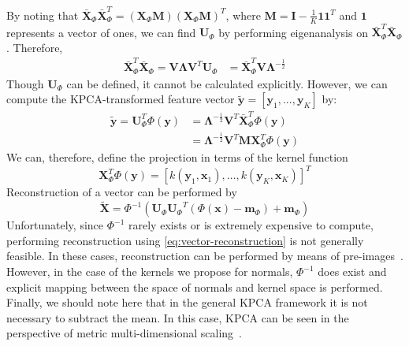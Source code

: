By noting that 
$\mathbf{\bar{X}}_\Phi \mathbf{\bar{X}}_\Phi^T = (\mathbf{X}_\Phi \mathbf{M}) (\mathbf{X}_\Phi \mathbf{M})^T$, 
where $\mathbf{M} = \mathbf{I} - \frac{1}{K} \mathbf{1} \mathbf{1}^T$ and
$\mathbf{1}$ represents a vector of ones, we can find
$\mathbf{U}_\Phi$ by performing eigenanalysis on
$\bar{\mathbf{X}}_\Phi^T \bar{\mathbf{X}}_\Phi$. Therefore,
\begin{equation}
    \begin{aligned}\label{eq:x-bar-corr}
        \mathbf{\bar{X}}_\Phi^T \mathbf{\bar{X}}_\Phi = \mathbf{V} \boldsymbol{\Lambda} \mathbf{V}^T \mathbf{U}_{\Phi} &= \mathbf{\bar{X}}_\Phi^T \mathbf{V} \boldsymbol{\Lambda}^{-\frac{1}{2}}
    \end{aligned}
\end{equation}
Though $\mathbf{U}_\Phi$ can be defined, it cannot be calculated explicitly. 
However, we can compute the KPCA-transformed feature vector
 $\mathbf{\tilde{y}} = [\mathbf{y}_1, ..., \mathbf{y}_K]$ by:
\begin{equation}
    \begin{aligned}\label{eq:projections}
        \mathbf{\tilde{y}} = \mathbf{U}_\Phi^T \Phi(\mathbf{y}) &= \boldsymbol{\Lambda}^{-\frac{1}{2}} \mathbf{V}^T \mathbf{\bar{X}}_\Phi^T \Phi(\mathbf{y}) \\
        &= \boldsymbol{\Lambda}^{-\frac{1}{2}} \mathbf{V}^T \mathbf{M} \mathbf{X}_\Phi^T \Phi(\mathbf{y})
    \end{aligned}
\end{equation}
We can, therefore, define the projection in terms of the kernel function
\begin{equation}\label{eq:kernel-vector}
        \mathbf{X}_\Phi^T \Phi(\mathbf{y}) = \left[ k(\mathbf{y}_1, \mathbf{x}_1), \ldots, k(\mathbf{y}_K, \mathbf{x}_K) \right]^T
\end{equation}
Reconstruction of a vector can be performed by
\begin{equation}\label{eq:vector-reconstruction}
        \mathbf{\tilde{X}} = {\Phi}^{-1} \left( \mathbf{U}_{\Phi} {\mathbf{U}_{\Phi}}^T (\Phi(\mathbf{x}) - \mathbf{m}_{\Phi}) + \mathbf{m}_{\Phi} \right)
\end{equation}
Unfortunately, since ${\Phi}^{-1}$ rarely exists or is extremely expensive to 
compute, performing reconstruction using \cref{eq:vector-reconstruction} is not 
generally feasible. In these cases, reconstruction can be performed by means of 
pre-images~\cite{kwok2004pre}. However, in the case of the kernels we propose
for normals, ${\Phi}^{-1}$ does exist and explicit mapping between the space of
normals and kernel space is performed. Finally, we should note here that in the 
general KPCA framework it is not necessary to subtract the mean. In this case, 
KPCA can be seen in the perspective of metric multi-dimensional 
scaling~\cite{williams2002connection}.
